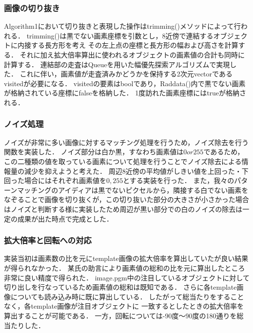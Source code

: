 \documentclass[uplatex,dvipdfmx]{jsarticle}
\begin{document}


\subsubsection{画像の切り抜き}
Algorithm1において切り抜きと表現した操作はtrimming()メソッドによって行われる．
trimming()は黒でない画素座標を引数とし，8近傍で連結するオブジェクトに内接する長方形を考え
その左上点の座標と長方形の幅および高さを計算する．
それに加え拡大倍率算出に使われるオブジェクトの画素値の合計も同時に計算する．
連結部の走査はQueueを用いた幅優先探索アルゴリズムで実現した．
これに伴い，画素値が走査済みかどうかを保持する2次元vectorであるvisitedが必要になる．
visitedの要素はboolであり，Raddata()内で黒でない画素が格納されている座標にfalseを格納した．
1度訪れた画素座標にはtrueが格納される．\\



\subsubsection{ノイズ処理}
ノイズが非常に多い画像に対するマッチング処理を行うため，ノイズ除去を行う関数を実装した．
ノイズ部分は白か黒，すなわち画素値は$0 or 255$であるため，この二種類の値を取っている画素について処理を行うことでノイズ除去による情報量の減少を抑えようと考えた．
周辺8近傍の平均値がしきい値を上回った・下回った場合にはそれぞれ画素値を$0,255$とする実装を行った．
また，我々のパターンマッチングのアイディアは黒でないピクセルから，隣接する白でない画素をなぞることで画像を切り抜くが，この切り抜いた部分の大きさが小さかった場合はノイズと判断する様に実装したため周辺が黒い部分での白のノイズの除去は一定の成果が出た時点で完成とした．


\subsubsection{拡大倍率と回転への対応}
実装当初は画素数の比を元にtemplate画像の拡大倍率を算出していたが良い結果が得られなかった．
某氏の助言により画素値の総和の比を元に算出したところ非常に良い精度で得られた．
image.pgm中の注目しているオブジェクトに対して切り出しを行なっているため画素値の総和は既知である．
さらに各template画像についても読み込み時に既に算出している．
したがって総当たりをすることなく，各template画像が注目オブジェクトに
一致するとしたときの拡大倍率を算出することが可能である．
一方，回転については-90度〜90度の180通りを総当たりした．
\end{document}
